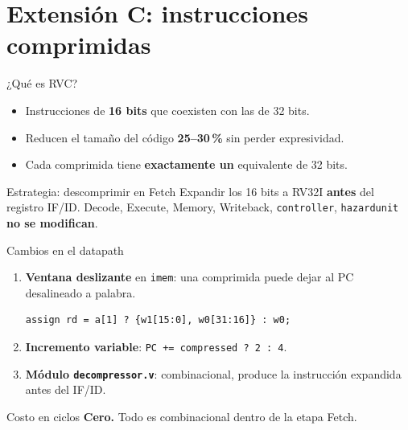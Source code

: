 \documentclass{beamer}
\begin{document}
\section{Extensión C: instrucciones comprimidas}

\begin{frame}{¿Qué es RVC?}
  \begin{itemize}
    \item Instrucciones de \textbf{16 bits} que coexisten con las de 32 bits.
    \item Reducen el tamaño del código \textbf{25--30\,\%} sin perder
      expresividad.
    \item Cada comprimida tiene \textbf{exactamente un} equivalente de 32 bits.
  \end{itemize}
  \begin{alertblock}{Estrategia: descomprimir en Fetch}
    Expandir los 16 bits a RV32I \textbf{antes} del registro IF/ID. Decode,
    Execute, Memory, Writeback, \texttt{controller}, \texttt{hazardunit}
    \textbf{no se modifican}.
  \end{alertblock}
\end{frame}

\begin{frame}[fragile]{Cambios en el datapath}
  \begin{enumerate}
    \item \textbf{Ventana deslizante} en \texttt{imem}: una comprimida puede
      dejar al PC desalineado a palabra.
\begin{lstlisting}
assign rd = a[1] ? {w1[15:0], w0[31:16]} : w0;
\end{lstlisting}
    \item \textbf{Incremento variable}: \texttt{PC += compressed ? 2 : 4}.
    \item \textbf{Módulo \texttt{decompressor.v}}: combinacional, produce la
      instrucción expandida antes del IF/ID.
  \end{enumerate}
  \begin{block}{Costo en ciclos}
    \textbf{Cero.} Todo es combinacional dentro de la etapa Fetch.
  \end{block}
\end{frame}
\end{document}
